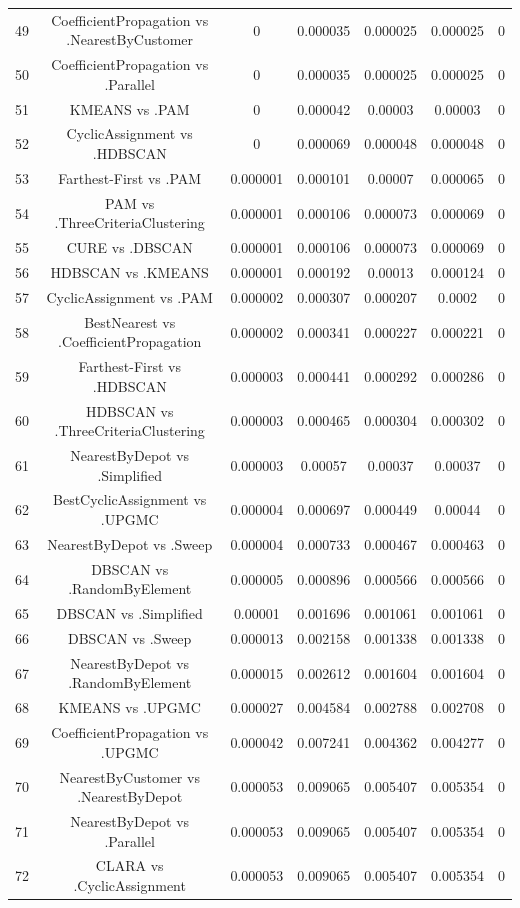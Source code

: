 \documentclass[a4paper,10pt]{article}
\begin{document}
\begin{landscape}
\begin{table}[!htp]
\begin{tabular}{ccccccc}
49&CoefficientPropagation vs .NearestByCustomer&0&0.000035&0.000025&0.000025&0\\
50&CoefficientPropagation vs .Parallel&0&0.000035&0.000025&0.000025&0\\
51&KMEANS vs .PAM&0&0.000042&0.00003&0.00003&0\\
52&CyclicAssignment vs .HDBSCAN&0&0.000069&0.000048&0.000048&0\\
53&Farthest-First vs .PAM&0.000001&0.000101&0.00007&0.000065&0\\
54&PAM vs .ThreeCriteriaClustering&0.000001&0.000106&0.000073&0.000069&0\\
55&CURE vs .DBSCAN&0.000001&0.000106&0.000073&0.000069&0\\
56&HDBSCAN vs .KMEANS&0.000001&0.000192&0.00013&0.000124&0\\
57&CyclicAssignment vs .PAM&0.000002&0.000307&0.000207&0.0002&0\\
58&BestNearest vs .CoefficientPropagation&0.000002&0.000341&0.000227&0.000221&0\\
59&Farthest-First vs .HDBSCAN&0.000003&0.000441&0.000292&0.000286&0\\
60&HDBSCAN vs .ThreeCriteriaClustering&0.000003&0.000465&0.000304&0.000302&0\\
61&NearestByDepot vs .Simplified&0.000003&0.00057&0.00037&0.00037&0\\
62&BestCyclicAssignment vs .UPGMC&0.000004&0.000697&0.000449&0.00044&0\\
63&NearestByDepot vs .Sweep&0.000004&0.000733&0.000467&0.000463&0\\
64&DBSCAN vs .RandomByElement&0.000005&0.000896&0.000566&0.000566&0\\
65&DBSCAN vs .Simplified&0.00001&0.001696&0.001061&0.001061&0\\
66&DBSCAN vs .Sweep&0.000013&0.002158&0.001338&0.001338&0\\
67&NearestByDepot vs .RandomByElement&0.000015&0.002612&0.001604&0.001604&0\\
68&KMEANS vs .UPGMC&0.000027&0.004584&0.002788&0.002708&0\\
69&CoefficientPropagation vs .UPGMC&0.000042&0.007241&0.004362&0.004277&0\\
70&NearestByCustomer vs .NearestByDepot&0.000053&0.009065&0.005407&0.005354&0\\
71&NearestByDepot vs .Parallel&0.000053&0.009065&0.005407&0.005354&0\\
72&CLARA vs .CyclicAssignment&0.000053&0.009065&0.005407&0.005354&0\\

\end{tabular}
\end{table}
\end{landscape}
\end{document}

